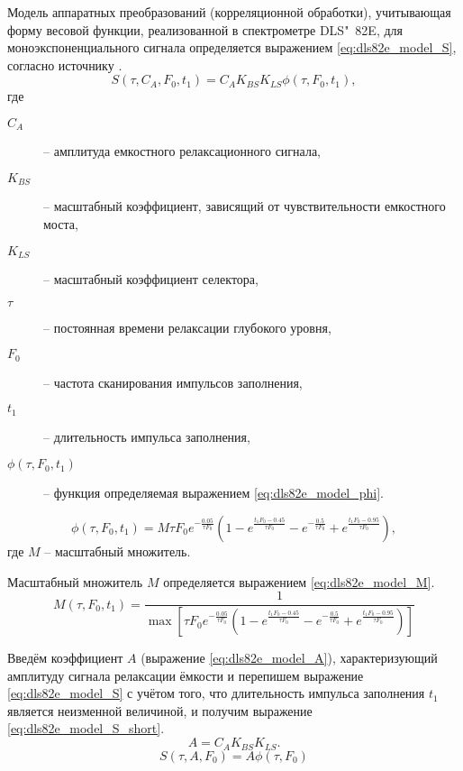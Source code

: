     Модель аппаратных преобразований (корреляционной обработки),
    учитывающая форму весовой функции, реализованной в спектрометре
    DLS"~82E, для моноэкспоненциального сигнала определяется выражением
    \ref{eq:dls82e_model_S}, согласно источнику \cite{rp_vak}.
    \begin{equation}
        \label{eq:dls82e_model_S}
        S\left(\tau,C_A,F_0, t_1\right) = C_A K_{BS} K_{LS} 
        \phi\left(\tau,F_0,t_1\right),
    \end{equation}
    где
    \begin{description}
        \item[$C_A$] -- амплитуда емкостного релаксационного сигнала,
        \item[$K_{BS}$] -- масштабный коэффициент, зависящий от 
        чувствительности емкостного моста,
        \item[$K_{LS}$] -- масштабный коэффициент селектора,
        \item[$\tau$] -- постоянная времени релаксации глубокого уровня,
        \item[$F_0$] -- частота сканирования импульсов заполнения,
        \item[$t_1$] -- длительность импульса заполнения,
        \item[$\phi\left(\tau,F_0,t_1\right)$] -- функция определяемая
        выражением \ref{eq:dls82e_model_phi}.
    \end{description}
    \begin{equation}
        \label{eq:dls82e_model_phi}
        \phi\left(\tau,F_0,t_1\right) = 
        M \tau F_0 e^{-\frac{0.05}{\tau F_0}}
        \left(1-e^{\frac{t_1 F_0-0.45}{\tau F_0}}
        -e^{-\frac{0.5}{\tau F_0}}+
        e^{\frac{t_1 F_0-0.95}{\tau F_0}}\right),
    \end{equation}
    где $M$ -- масштабный множитель.

    Масштабный множитель $M$ определяется выражением
    \ref{eq:dls82e_model_M}.
    \begin{equation}
        \label{eq:dls82e_model_M}
        M(\tau, F_0, t_1) = \frac{1}{\max{\left[
        \tau F_0 e^{-\frac{0.05}{\tau F_0}}
        \left(1-e^{\frac{t_1 F_0-0.45}{\tau F_0}}
        -e^{-\frac{0.5}{\tau F_0}}+
        e^{\frac{t_1 F_0-0.95}{\tau F_0}}\right)
        \right]}}
    \end{equation}

    Введём коэффициент $A$ (выражение \ref{eq:dls82e_model_A}), 
    характеризующий амплитуду сигнала релаксации ёмкости и перепишем 
    выражение \ref{eq:dls82e_model_S} с учётом того, что длительность
    импульса заполнения $t_1$ является неизменной величиной, и получим
    выражение \ref{eq:dls82e_model_S_short}.
    \begin{equation}
        \label{eq:dls82e_model_A}
        A = C_A K_{BS} K_{LS}.
    \end{equation}
    \begin{equation}
        \label{eq:dls82e_model_S_short}
        S(\tau,A,F_0) = A\phi(\tau, F_0)
    \end{equation}


